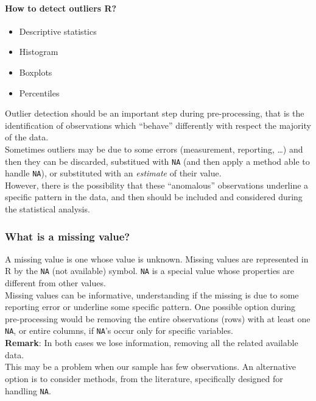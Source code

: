 \documentclass[
]{article}
\providecommand{\tightlist}{%
  \setlength{\itemsep}{0pt}\setlength{\parskip}{0pt}}
\begin{document}
\hypertarget{how-to-detect-outliers-r}{%
\paragraph{How to detect outliers R?}\label{how-to-detect-outliers-r}}

\begin{itemize}
\tightlist
\item
  Descriptive statistics
\item
  Histogram
\item
  Boxplots
\item
  Percentiles
\end{itemize}

Outlier detection should be an important step during pre-processing,
that is the identification of observations which ``behave'' differently
with respect the majority of the data.\\
Sometimes outliers may be due to some errors (measurement, reporting,
\ldots) and then they can be discarded, substitued with \texttt{NA} (and
then apply a method able to handle \texttt{NA}), or substituted with an
\emph{estimate} of their value.\\
However, there is the possibility that these ``anomalous'' observations
underline a specific pattern in the data, and then should be included
and considered during the statistical analysis.

\hypertarget{what-is-a-missing-value}{%
\subsubsection{What is a missing value?}\label{what-is-a-missing-value}}

A missing value is one whose value is unknown. Missing values are
represented in R by the \texttt{NA} (not available) symbol. \texttt{NA}
is a special value whose properties are different from other values.\\
Missing values can be informative, understanding if the missing is due
to some reporting error or underline some specific pattern. One possible
option during pre-processing would be removing the entire observations
(rows) with at least one \texttt{NA}, or entire columns, if
\texttt{NA}'s occur only for specific variables.\\
\textbf{Remark}: In both cases we lose information, removing all the
related available data.\\
This may be a problem when our sample has few observations. An
alternative option is to consider methods, from the literature,
specifically designed for handling \texttt{NA}.
\end{document}
